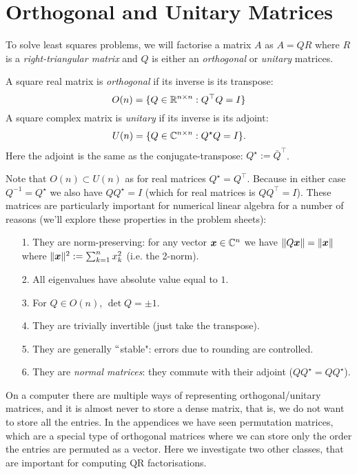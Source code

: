 
\section{Orthogonal and Unitary Matrices}
To solve least squares problems, we will  factorise a matrix $A$ as $A = QR$ where $R$ is a \emph{right-triangular matrix} and $Q$ is either an \emph{orthogonal} or \emph{unitary} matrices.

\begin{definition} A square real matrix is \emph{orthogonal} if its inverse is its transpose:
\[
O(n) = \{Q \in {\mathbb R}^{n \times n} : Q^\top Q = I \}
\]
A square complex matrix is \emph{unitary} if its inverse is its adjoint:
\[
U(n) = \{Q \in {\mathbb C}^{n \times n} : Q^\star Q = I \}.
\]
Here the adjoint is the same as the conjugate-transpose: $Q^\ensuremath{\star} := \bar Q^\ensuremath{\top}$.  \end{definition}

Note that $O(n) \ensuremath{\subset} U(n)$ as for real matrices $Q^\ensuremath{\star} = Q^\ensuremath{\top}$. Because in either case $Q^{-1} = Q^\ensuremath{\star}$ we also have $Q Q^\ensuremath{\star} = I$ (which for real matrices is $Q Q^\ensuremath{\top} = I$). These matrices are particularly important for numerical linear algebra for a number of reasons (we'll explore these properties in the problem sheets):

\begin{itemize}
\item[1. ] They are norm-preserving: for any vector $\bm{{\mbox{\boldmath$x$\unboldmath}}} \in {\mathbb C}^n$ we have $\|Q \bm{{\mbox{\boldmath$x$\unboldmath}}} \| = \| \bm{{\mbox{\boldmath$x$\unboldmath}}}\|$ where $\| \bm{{\mbox{\boldmath$x$\unboldmath}}} \|^2 := \sum_{k=1}^n x_k^2$ (i.e. the 2-norm).


\item[2. ] All eigenvalues have absolute value equal to $1$.


\item[3. ] For $Q \ensuremath{\in} O(n)$,  $\det Q = \ensuremath{\pm}1$.


\item[4. ] They are trivially invertible (just take the transpose).


\item[5. ] They are generally \ensuremath{\ldq}stable": errors due to rounding are controlled.


\item[6. ] They are \emph{normal matrices}: they commute with their adjoint ($Q Q^\ensuremath{\star} = Q Q^\ensuremath{\star}$). 

\end{itemize}
On a computer there are multiple ways of representing orthogonal/unitary matrices, and it is almost never to store a dense matrix, that is, we do not want to store all the entries. In the appendices we have seen permutation matrices, which are a special type of orthogonal matrices where we can store only the order the entries are permuted as a vector.  Here we investigate two other classes, that are important for computing QR factorisations.

